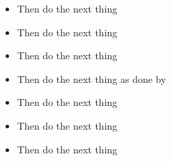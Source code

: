 \documentclass[10pt,a4paper]{scanner_protocol}
\begin{document}
\begin{itemize}
	\item Then do the next thing
	\item Then do the next thing
	\item Then do the next thing
\end{itemize}
\divider

\begin{itemize}
	\item Then do the next thing as done by \cite{einstein}
	\item Then do the next thing
	\item Then do the next thing
	\item Then do the next thing
\end{itemize}
\divider


\clearpage


\nocite{*}

\printbibliography


\divider


\end{document}
